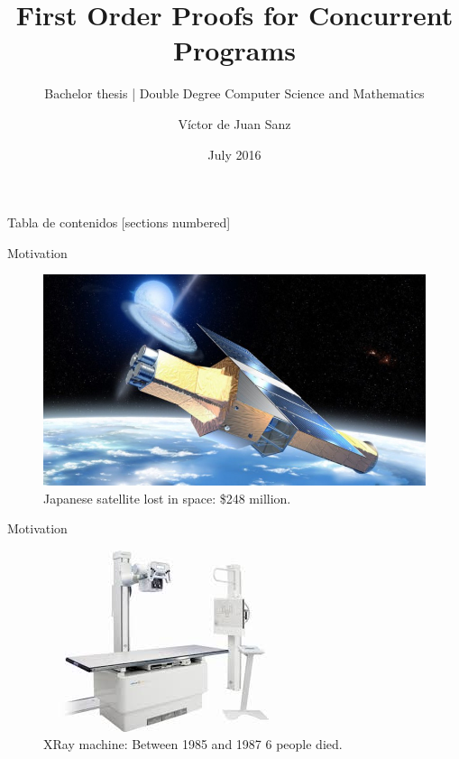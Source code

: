 \documentclass[10pt,notes,compress,usetitleprogressbar,aspectratio=1610]{beamer}
\title{First Order Proofs for Concurrent Programs}
\subtitle{Bachelor thesis | Double Degree Computer Science and Mathematics}
\author{Víctor de Juan Sanz}
\date{July 2016}
\institute{Imdea Software}
\begin{document}
\maketitle

\begin{frame}{Tabla de contenidos}
  [sections numbered]
  \tableofcontents[hideallsubsections]
\end{frame}


\begin{frame}{Motivation}
	\begin{figure}
		\centering
		\includegraphics[scale=0.4]{imgs/japanesse.jpg}
		\caption{Japanese satellite lost in space: \$248 million.}
	\end{figure}
\end{frame}

\begin{frame}{Motivation}
	\begin{figure}
		\includegraphics[scale=0.9]{imgs/xray.jpg}
		\caption{XRay machine: Between 1985 and 1987 6 people died.}
	\end{figure}
\end{frame}
\end{document}
